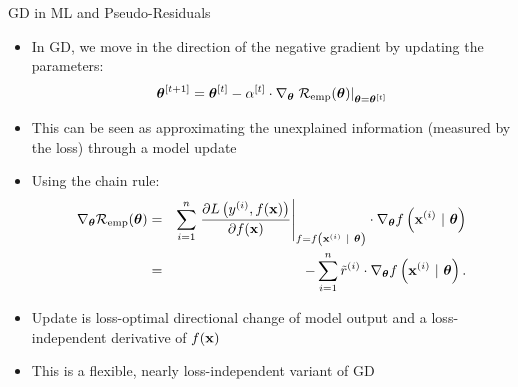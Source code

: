 \documentclass[11pt,compress,t,notes=noshow, xcolor=table]{beamer}
\begin{document}
\begin{vbframe}{GD in ML and Pseudo-Residuals}

\begin{itemize}
	\item In GD, we move in the direction of the negative gradient by updating the parameters: 
	$$
	 \bm{\theta}^{[t + 1]} = \bm{\theta}^{[t]} - \alpha^{[t]} \cdot \nabla_{\bm{\theta}} \left.\mathcal{R}_{\text{emp}}(\bm{\theta})\right|_{\bm{\theta} = \bm{\theta}^{[t]}}	
	$$
	\item This can be seen as approximating the unexplained information (measured by the loss) through a model update
	\item Using the chain rule:
	\begin{eqnarray*}
	\nabla_{\bm{\theta}} \mathcal{R}_{\text{emp}}(\bm{\theta}) &=&\sum\limits_{i=1}^n \left.\frac{\partial L\left(y^{(i)}, f(\mathbf{x})\right)}{\partial f(\mathbf{x})} \right|_{f = f\left(\mathbf{x}^{(i)} ~|~ \bm{\theta}\right)} 
	\cdot \nabla_{\bm{\theta}} f\left(\mathbf{x}^{(i)} ~|~ \bm{\theta}\right) \\ 
	&=& - \sum\limits_{i=1}^n \tilde r^{(i)} \cdot \nabla_{\bm{\theta}} f\left(\mathbf{x}^{(i)} ~|~ \bm{\theta}\right).
	\end{eqnarray*}
	\item Update is loss-optimal directional change of model output 
        and a loss-independent derivative of $f(\mathbf{x})$
        \item This is a flexible, nearly loss-independent variant of GD
\end{itemize}	

\end{vbframe}
\end{document}
